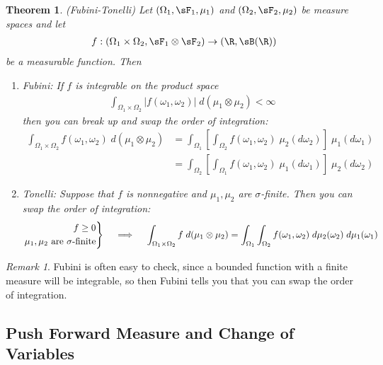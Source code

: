 \documentclass[12pt]{article}
\theoremstyle{plain}
\newtheorem{thm}{Theorem}[section]
\theoremstyle{definition}
\theoremstyle{remark}
\newtheorem*{rmk}{Remark}
\newcommand{\ra}{\rightarrow}
\newenvironment{rcases}
  {\left.\begin{aligned}}
  {\end{aligned}\right\rbrace}
\begin{document}
\begin{thm}\emph{(Fubini-Tonelli)}
Let
$(\Omega_1,\sF_1,\mu_1)$ and
$(\Omega_2,\sF_2,\mu_2)$
be measure spaces and let
\begin{align*}
  f:
  (\Omega_1\times \Omega_2, \sF_1\otimes\sF_2)
  \ra
  (\R,\sB(\R))
\end{align*}
be a measurable function. Then
\begin{enumerate}
  \item \emph{Fubini}:
    If $f$ is integrable on the product space
    \begin{align*}
      \int_{\Omega_1\times \Omega_2}
      |f(\omega_1,\omega_2)| \; d(\mu_1\otimes\mu_2)
      <\infty
    \end{align*}
    then you can break up and swap the order of integration:
    \begin{align*}
      \int_{\Omega_1\times \Omega_2}
      f(\omega_1,\omega_2) \; d(\mu_1\otimes\mu_2)
      &=
      \int_{\Omega_1} \left[\int_{\Omega_2}
      f(\omega_1,\omega_2)
      \;\mu_2(d\omega_2) \right]\;\mu_1(d\omega_1) \\
      &=
      \int_{\Omega_2}\left[
        \int_{\Omega_1}
      f(\omega_1,\omega_2)
      \;\mu_1(d\omega_1) \right]\;\mu_2(d\omega_2)
    \end{align*}

  \item \emph{Tonelli}:
    Suppose that $f$ is nonnegative and $\mu_1,\mu_2$ are
    $\sigma$-finite. Then you can swap the order of integration:
    \begin{align*}
      \begin{rcases}
      f\geq 0 \\
      \text{$\mu_1,\mu_2$ are $\sigma$-finite}
      \end{rcases}
      \quad\implies \quad
      \int_{\Omega_1\times \Omega_2}
      f \; d(\mu_1\otimes\mu_2)
      =
      \int_{\Omega_1}\int_{\Omega_2}
      f(\omega_1,\omega_2)
      \;d\mu_2(\omega_2) \;d\mu_1(\omega_1)
    \end{align*}
\end{enumerate}
\end{thm}
\begin{rmk}
Fubini is often easy to check, since a bounded function with a finite
measure will be integrable, so then Fubini tells you that you can swap
the order of integration.
\end{rmk}

\subsection{Push Forward Measure and Change of Variables}
\end{document}
